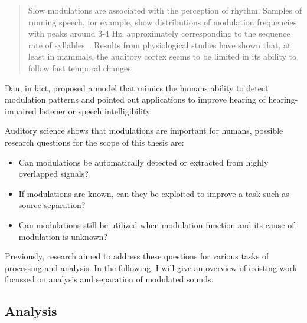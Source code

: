 \begin{quote}
Slow modulations are associated with the perception of rhythm. Samples of running speech, for example, show distributions of modulation frequencies with peaks around 3-4 Hz, approximately corresponding to the sequence rate of syllables~\cite{plomp93}. Results from physiological studies have shown that, at least in mammals, the auditory cortex seems to be limited in its ability to follow fast temporal changes.  
\end{quote}

Dau, in fact, proposed a model that mimics the humans ability to detect modulation patterns and pointed out applications to improve hearing of hearing-impaired listener or speech intelligibility.
\par
Auditory science shows that modulations are important for humans, possible research questions for the scope of this thesis are:

\begin{itemize}
  \item Can modulations be automatically detected or extracted from highly overlapped signals?
  \item If modulations are known, can they be exploited to improve a task such as source separation?
  \item Can modulations still be utilized when modulation function and its cause of modulation is unknown?
\end{itemize}

Previously, research aimed to address these questions for various tasks of processing and analysis. 
In the following, I will give an overview of existing work focussed on analysis and separation of modulated sounds.

\subsection{Analysis}

